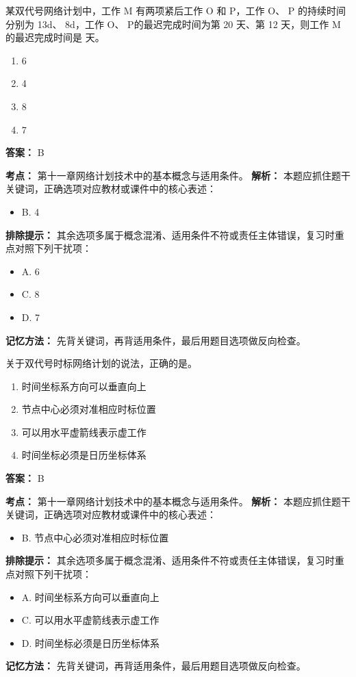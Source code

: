 \documentclass[UTF8,fontset=fandol,11pt]{ctexart}
\begin{document}
\begin{quizbox}[title={第 9 题}]
某双代号网络计划中，工作 M 有两项紧后工作 O 和 P，工作 O、 P 的持续时间分别为 13d、 8d，工作 O、 P的最迟完成时间为第 20 天、第 12 天，则工作 M 的最迟完成时间是 天。\\
\begin{enumerate}[label=\Alph*.]
\item 6
\item 4
\item 8
\item 7
\end{enumerate}
\textbf{答案：} B
\vspace{0.25em}
\begin{answerbox}[title={考点解析}]
\textbf{考点：} 第十一章网络计划技术中的基本概念与适用条件。
\textbf{解析：} 本题应抓住题干关键词，正确选项对应教材或课件中的核心表述：
\begin{itemize}
\item B. 4
\end{itemize}
\textbf{排除提示：} 其余选项多属于概念混淆、适用条件不符或责任主体错误，复习时重点对照下列干扰项：
\begin{itemize}
\item A. 6
\item C. 8
\item D. 7
\end{itemize}
\textbf{记忆方法：} 先背关键词，再背适用条件，最后用题目选项做反向检查。
\end{answerbox}
\end{quizbox}

\begin{quizbox}[title={第 10 题}]
关于双代号时标网络计划的说法，正确的是。\\
\begin{enumerate}[label=\Alph*.]
\item 时间坐标系方向可以垂直向上
\item 节点中心必须对准相应时标位置
\item 可以用水平虚箭线表示虚工作
\item 时间坐标必须是日历坐标体系
\end{enumerate}
\textbf{答案：} B
\vspace{0.25em}
\begin{answerbox}[title={考点解析}]
\textbf{考点：} 第十一章网络计划技术中的基本概念与适用条件。
\textbf{解析：} 本题应抓住题干关键词，正确选项对应教材或课件中的核心表述：
\begin{itemize}
\item B. 节点中心必须对准相应时标位置
\end{itemize}
\textbf{排除提示：} 其余选项多属于概念混淆、适用条件不符或责任主体错误，复习时重点对照下列干扰项：
\begin{itemize}
\item A. 时间坐标系方向可以垂直向上
\item C. 可以用水平虚箭线表示虚工作
\item D. 时间坐标必须是日历坐标体系
\end{itemize}
\textbf{记忆方法：} 先背关键词，再背适用条件，最后用题目选项做反向检查。
\end{answerbox}
\end{quizbox}
\end{document}
